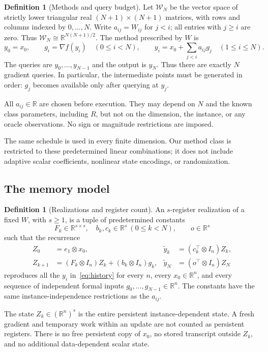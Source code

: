 \documentclass[11pt]{article}
\numberwithin{equation}{section}
\theoremstyle{definition}
\newtheorem{definition}[theorem]{Definition}
\newcommand{\R}{\mathbb R}
\newcommand{\W}{\mathcal W_N}
\begin{document}
\begin{definition}[Methods and query budget]\label{def:methods}
Let $\W$ be the vector space of strictly lower triangular real $(N+1)\times(N+1)$ matrices, with rows and columns indexed by $0,\ldots,N$. Write $a_{ij}=W_{ij}$ for $j<i$; all entries with $j\ge i$ are zero. Thus $\W\cong\R^{N(N+1)/2}$. The method prescribed by $W$ is
\begin{equation}
 y_0=x_0,\qquad g_i=\nabla f(y_i)\quad(0\le i<N),\qquad
 y_i=x_0+\sum_{j<i}a_{ij}g_j\quad(1\le i\le N).
 \label{eq:history}
\end{equation}
The queries are $y_0,\ldots,y_{N-1}$ and the output is $y_N$. Thus there are exactly $N$ gradient queries. In particular, the intermediate points must be generated in order: $g_j$ becomes available only after querying at $y_j$.

All $a_{ij}\in\R$ are chosen before execution. They may depend on $N$ and the known class parameters, including $R$, but not on the dimension, the instance, or any oracle observations. No sign or magnitude restrictions are imposed.
\end{definition}

The same schedule is used in every finite dimension. Our method class is restricted to these predetermined linear combinations; it does not include adaptive scalar coefficients, nonlinear state encodings, or randomization.

\subsection{The memory model}
\begin{definition}[Realizations and register count]\label{def:memory}
An $s$-register realization of a fixed $W$, with $s\ge1$, is a tuple of predetermined constants
\[
 F_k\in\R^{s\times s},\quad b_k,c_k\in\R^s\ (0\le k<N),
 \qquad o\in\R^s
\]
such that the recurrence
\begin{align}
 Z_0&=e_1\otimes x_0,&
 \widetilde y_k&=(c_k^\top\otimes I_n)Z_k,\nonumber\\
 Z_{k+1}&=(F_k\otimes I_n)Z_k+(b_k\otimes I_n)g_k,&
 \widetilde y_N&=(o^\top\otimes I_n)Z_N
 \label{eq:state}
\end{align}
reproduces all the $y_i$ in~\eqref{eq:history} for every $n$, every $x_0\in\R^n$, and every sequence of independent formal inputs $g_0,\ldots,g_{N-1}\in\R^n$. The constants have the same instance-independence restrictions as the $a_{ij}$.

The state $Z_k\in(\R^n)^s$ is the entire persistent instance-dependent state. A fresh gradient and temporary work within an update are not counted as persistent registers. There is no free persistent copy of $x_0$, no stored transcript outside $Z_k$, and no additional data-dependent scalar state.
\end{definition}
\end{document}

